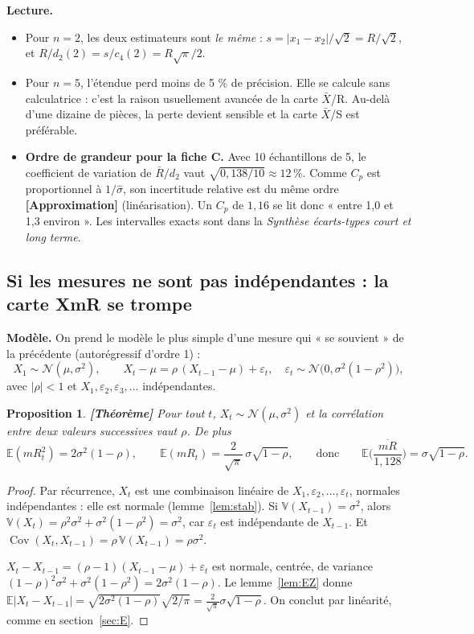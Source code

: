 \documentclass[11pt,a4paper]{article}
\theoremstyle{tq}
\newtheorem{prop}{Proposition}
\theoremstyle{remark}
\newcommand{\thm}{\textcolor{vertTQ}{\textbf{[Théorème]}}}
\newcommand{\appr}{\textcolor{uimmred}{\textbf{[Approximation]}}}
\newcommand{\E}{\mathbb{E}}
\newcommand{\V}{\mathbb{V}}
\newcommand{\N}{\mathcal{N}}
\newcommand{\Rb}{\bar{R}}
\newcommand{\mRb}{\overline{mR}}
\begin{document}
\textbf{Lecture.}
\begin{itemize}[nosep,leftmargin=1.2em]
\item Pour $n=2$, les deux estimateurs sont \emph{le même} : $s=|x_1-x_2|/\sqrt2=R/\sqrt2$, et $R/d_2(2)=s/c_4(2)=R\sqrt\pi/2$.
\item Pour $n=5$, l'étendue perd moins de 5 \% de précision. Elle se calcule sans calculatrice : c'est la raison usuellement avancée de la carte $\bar X$/R. Au-delà d'une dizaine de pièces, la perte devient sensible et la carte $\bar X$/S est préférable.
\item \textbf{Ordre de grandeur pour la fiche C.} Avec 10 échantillons de 5, le coefficient de variation de $\Rb/d_2$ vaut $\sqrt{0{,}138/10}\approx12\,\%$. Comme $C_p$ est proportionnel à $1/\hat\sigma$, son incertitude relative est du même ordre \appr{} (linéarisation). Un $C_p$ de $1{,}16$ se lit donc « entre 1,0 et 1,3 environ ». Les intervalles exacts sont dans la \emph{Synthèse écarts-types court et long terme}.
\end{itemize}

\subsection{Si les mesures ne sont pas indépendantes : la carte XmR se trompe}\label{sec:autocorr}
\textbf{Modèle.} On prend le modèle le plus simple d'une mesure qui « se souvient » de la précédente (autorégressif d'ordre 1) :
\[
X_1\sim\N(\mu,\sigma^2),\qquad X_t-\mu=\rho\,(X_{t-1}-\mu)+\varepsilon_t,\quad \varepsilon_t\sim\N\big(0,\sigma^2(1-\rho^2)\big),
\]
avec $|\rho|<1$ et $X_1,\varepsilon_2,\varepsilon_3,\dots$ indépendantes.
\begin{prop}\thm{}
Pour tout $t$, $X_t\sim\N(\mu,\sigma^2)$ et la corrélation entre deux valeurs successives vaut $\rho$. De plus
\[
\E(mR_t^2)=2\sigma^2(1-\rho),\qquad \E(mR_t)=\frac{2}{\sqrt\pi}\,\sigma\sqrt{1-\rho},\qquad\text{donc}\qquad \E\Big(\frac{\mRb}{1{,}128}\Big)=\sigma\sqrt{1-\rho}.
\]
\end{prop}
\begin{proof}
Par récurrence, $X_t$ est une combinaison linéaire de $X_1,\varepsilon_2,\dots,\varepsilon_t$, normales indépendantes : elle est normale (lemme~\ref{lem:stab}). Si $\V(X_{t-1})=\sigma^2$, alors $\V(X_t)=\rho^2\sigma^2+\sigma^2(1-\rho^2)=\sigma^2$, car $\varepsilon_t$ est indépendante de $X_{t-1}$. Et $\operatorname{Cov}(X_t,X_{t-1})=\rho\,\V(X_{t-1})=\rho\sigma^2$.

$X_t-X_{t-1}=(\rho-1)(X_{t-1}-\mu)+\varepsilon_t$ est normale, centrée, de variance $(1-\rho)^2\sigma^2+\sigma^2(1-\rho^2)=2\sigma^2(1-\rho)$. Le lemme~\ref{lem:EZ} donne $\E|X_t-X_{t-1}|=\sqrt{2\sigma^2(1-\rho)}\sqrt{2/\pi}=\frac{2}{\sqrt\pi}\sigma\sqrt{1-\rho}$. On conclut par linéarité, comme en section~\ref{sec:E}.
\end{proof}
\end{document}
